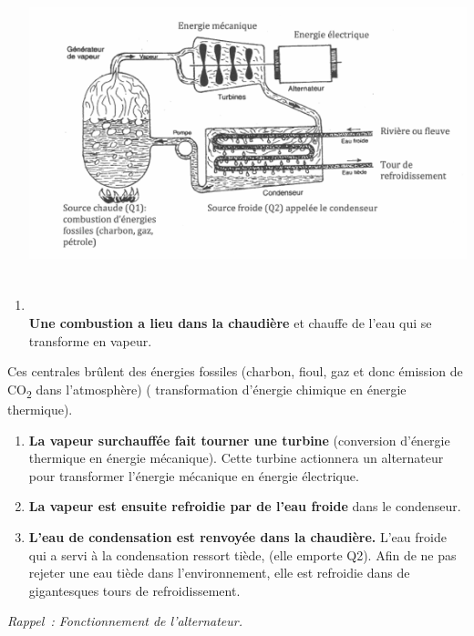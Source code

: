 \begin{enumerate}
\def\labelenumi{\arabic{enumi})}
\tightlist
\item
  \includegraphics[width=17.851cm,height=10.278cm]{Pictures/10000001000002220000013A629B591569517346.png}\textbf{Une
  combustion a lieu dans la chaudière} et chauffe de l'eau qui se
  transforme en vapeur.
\end{enumerate}

Ces centrales brûlent des énergies fossiles (charbon, fioul, gaz et donc
émission de CO\textsubscript{2} dans l'atmosphère) ( transformation
d'énergie chimique en énergie thermique).

\begin{enumerate}
\def\labelenumi{\arabic{enumi})}
\tightlist
\item
  \textbf{La vapeur surchauffée fait tourner une turbine} (conversion
  d'énergie thermique en énergie mécanique). Cette turbine actionnera un
  alternateur pour transformer l'énergie mécanique en énergie
  électrique.
\item
  \textbf{La vapeur est ensuite refroidie par de l'eau froide} dans le
  condenseur.
\item
  \textbf{L'eau de condensation est renvoyée dans la chaudière. }L'eau
  froide qui a servi à la condensation ressort tiède, (elle emporte Q2).
  Afin de ne pas rejeter une eau tiède dans l'environnement, elle est
  refroidie dans de gigantesques tours de refroidissement.
\end{enumerate}

\emph{Rappel~: Fonctionnement de l'alternateur. }

